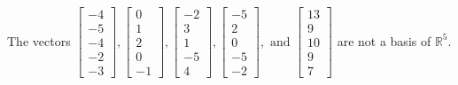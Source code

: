 \begin{exercise}
\begin{exerciseStatement}
  \end{exerciseStatement}
  \begin{exerciseAnswer}
   The vectors \(\left[\begin{array}{r}
-4 \\
-5 \\
-4 \\
-2 \\
-3
\end{array}\right] , \left[\begin{array}{r}
0 \\
1 \\
2 \\
0 \\
-1
\end{array}\right] , \left[\begin{array}{r}
-2 \\
3 \\
1 \\
-5 \\
4
\end{array}\right] , \left[\begin{array}{r}
-5 \\
2 \\
0 \\
-5 \\
-2
\end{array}\right] , \text{ and } \left[\begin{array}{r}
13 \\
9 \\
10 \\
9 \\
7
\end{array}\right]\) 
  	 are not  a basis of \(\mathbb{R}^5\).
  


  \end{exerciseAnswer}
\end{exercise}